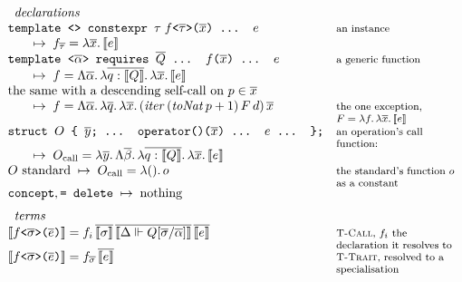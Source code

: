 \begin{figure}[htbp]
\[
\begin{array}{@{}l@{\quad}l@{}}
\multicolumn{2}{l}{\textit{declarations}} \\
\texttt{template <> constexpr } \tau\; f\texttt{<}\overline{\tau}\texttt{>(}\overline{x}\texttt{) ... } e & \note{an instance} \\
\qquad \mapsto\; f_{\overline{\tau}} = \lambda\overline{x}.\,\llbracket e \rrbracket & \\
\texttt{template <}\overline{\alpha}\texttt{> requires } \overline{Q}\texttt{ ... } f\texttt{(}\overline{x}\texttt{) ... } e & \note{a generic function} \\
\qquad \mapsto\; f = \Lambda\overline{\alpha}.\,\lambda\overline{q : \llbracket Q \rrbracket}.\,\lambda\overline{x}.\,\llbracket e \rrbracket & \\
\text{the same with a descending self-call on } p \in \overline{x} & \\
\qquad \mapsto\; f = \Lambda\overline{\alpha}.\,\lambda\overline{q}.\,\lambda\overline{x}.\,(\mathit{iter}\,(\mathit{toNat}\,p + 1)\,F\,d)\,\overline{x} & \note{the one exception, $F = \lambda f.\,\lambda\overline{x}.\,\llbracket e \rrbracket$} \\
\texttt{struct } O \texttt{ \{ } \overline{y}\texttt{; ... operator()(}\overline{x}\texttt{) ... } e \texttt{ ... \};} & \note{an operation's call function:} \\
\qquad \mapsto\; O_{\mathrm{call}} = \lambda\overline{y}.\,\Lambda\overline{\beta}.\,\lambda\overline{q : \llbracket Q \rrbracket}.\,\lambda\overline{x}.\,\llbracket e \rrbracket & \\
O \text{ standard} \;\mapsto\; O_{\mathrm{call}} = \lambda().\,o & \note{the standard's function $o$  as a constant} \\
\texttt{concept}, \texttt{= delete} \;\mapsto\; \text{nothing} & \\[6pt]
\multicolumn{2}{l}{\textit{terms}} \\
\llbracket f\texttt{<}\overline{\sigma}\texttt{>(}\overline{e}\texttt{)} \rrbracket = f_i\,\overline{\llbracket \sigma \rrbracket}\,\overline{\llbracket \Delta \Vdash Q[\overline{\sigma}/\overline{\alpha}] \rrbracket}\,\overline{\llbracket e \rrbracket} & \note{\textsc{T-Call}, $f_i$ the declaration it resolves to} \\
\llbracket f\texttt{<}\overline{\sigma}\texttt{>(}\overline{e}\texttt{)} \rrbracket = f_{\overline{\sigma}}\,\overline{\llbracket e \rrbracket} & \note{\textsc{T-Trait}, resolved to a specialisation} \\

\end{array}\]
\end{figure}
